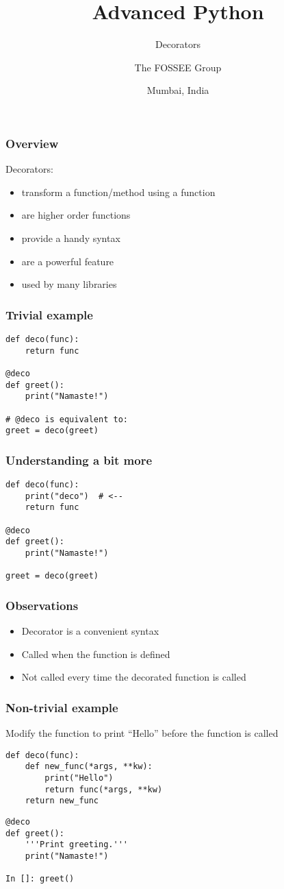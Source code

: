\documentclass[14pt,compress,aspectratio=169]{beamer}
\title[Decorators]{Advanced Python}
\subtitle{Decorators}
\author[FOSSEE] {The FOSSEE Group}
\institute[IIT Bombay] {Department of Aerospace Engineering\\IIT Bombay}
\date[] {Mumbai, India}
\begin{document}
\begin{frame}
  \titlepage
\end{frame}

\begin{frame}[fragile]
  \frametitle{Overview}
  Decorators:
  \begin{itemize}
  \item transform a function/method using a function
  \item are higher order functions
  \item provide a handy syntax
  \item are a powerful feature
  \item used by many libraries
  \end{itemize}
\end{frame}

\begin{frame}[fragile]
  \frametitle{Trivial example}
\begin{lstlisting}
def deco(func):
    return func

@deco
def greet():
    print("Namaste!")

# @deco is equivalent to:
greet = deco(greet)
\end{lstlisting}
\end{frame}

\begin{frame}[fragile]
  \frametitle{Understanding a bit more}
\begin{lstlisting}
def deco(func):
    print("deco")  # <--
    return func

@deco
def greet():
    print("Namaste!")

greet = deco(greet)
\end{lstlisting}
\end{frame}

\begin{frame}
  \frametitle{Observations}
  \begin{itemize}
  \item Decorator is a convenient syntax
  \item Called when the function is defined
  \item Not called every time the decorated function is called
  \end{itemize}
\end{frame}

\begin{frame}
  \frametitle{Non-trivial example}
Modify the function to print ``Hello'' before the function is called
\begin{lstlisting}
def deco(func):
    def new_func(*args, **kw):
        print("Hello")
        return func(*args, **kw)
    return new_func
\end{lstlisting}
\pause
\begin{lstlisting}
@deco
def greet():
    '''Print greeting.'''
    print("Namaste!")

In []: greet()

\end{lstlisting}
\end{frame}
\end{document}

